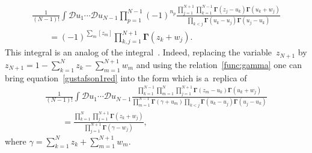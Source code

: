 \documentclass[pdftex]{sigma}
\numberwithin{equation}{section}
\begin{document}
\begin{gather}
\frac1{(N-1)!}\int \mathcal D u_1\cdots \mathcal Du_{N-1}
\prod_{p=1}^{N-1} (-1)^{n_p} \frac{\prod\limits_{j=1}^{N+1}\prod\limits_{k=1}^{N-1}\boldsymbol{\Gamma}(z_j-u_k)\boldsymbol{\Gamma}(u_k+w_j)}{
\prod\limits_{k<j} \boldsymbol{\Gamma}(u_k- u_j)\boldsymbol{\Gamma}(u_j- u_k)}\nonumber\\
\qquad{}=(-1)^{\sum_m [z_m]} \prod_{k,j=1}^{N+1}\boldsymbol{\Gamma}(z_k+ w_j).\label{gustafson1red}
\end{gather}
This integral is an analog of the integral~\cite[equation~(3.2)]{Gustafson92}. Indeed, replacing the variab\-le~$z_{N+1}$ by $z_{N+1}=1-\sum\limits_{k=1}^N z_k -\sum\limits_{m=1}^{N+1} w_m$ and using the relation~\eqref{func:gamma} one can bring equation~\eqref{gustafson1red} into the form which is a~replica of~\cite[equation~(3.2)]{Gustafson92}
\begin{gather}
\frac1{(N-1)!}
\int \mathcal D u_1\cdots \mathcal Du_{N-1}
\frac{\prod\limits_{k=1}^{N-1} \prod\limits_{m=1}^{N}\prod_{j=1}^{N+1}\boldsymbol{\Gamma}(z_m-u_k)\boldsymbol{\Gamma}(u_k+w_j)}{
\prod\limits_{m=1}^{N-1}\boldsymbol{\Gamma}(\gamma+u_m)
\prod\limits_{k<j} \boldsymbol{\Gamma}(u_k- u_j)\boldsymbol{\Gamma}(u_j- u_k)} \nonumber\\
\qquad{} =
\frac{\prod\limits_{k=1}^{N} \prod\limits_{j=1}^{N+1}\boldsymbol{\Gamma}(z_k+ w_j)}{\prod\limits_{j=1}^{N+1}\boldsymbol\Gamma(\gamma-w_j)},\label{gustafson-rform}
\end{gather}
where $\gamma=\sum\limits_{k=1}^N z_k + \sum\limits_{m=1}^{N+1} w_m$.
\end{document}
